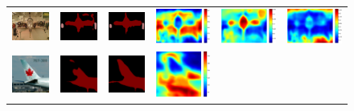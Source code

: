 \documentclass[10pt,twocolumn,letterpaper]{article}
\begin{document}
\begin{figure}
\begin{tabular}{c c c c c c}
   \includegraphics[height=0.092\linewidth]{fig/voc12/img/2011_002675.jpg} &
   \includegraphics[height=0.092\linewidth]{fig/voc12/res_baseline/2011_002675.png} &
   \includegraphics[height=0.092\linewidth]{fig/voc12/res_sharenet/2011_002675.png} &
   \includegraphics[height=0.092\linewidth]{fig/voc12/att1/2011_002675.pdf} &
   \includegraphics[height=0.092\linewidth]{fig/voc12/att2/2011_002675.pdf} &
   \includegraphics[height=0.092\linewidth]{fig/voc12/att3/2011_002675.pdf} \\
   \includegraphics[height=0.122\linewidth]{fig/voc12/img/2007_001568.jpg} &
   \includegraphics[height=0.122\linewidth]{fig/voc12/res_baseline/2007_001568.png} &
   \includegraphics[height=0.122\linewidth]{fig/voc12/res_sharenet/2007_001568.png} &
   \includegraphics[height=0.122\linewidth]{fig/voc12/att1/2007_001568.pdf} &

\end{tabular}
\end{figure}
\end{document}
